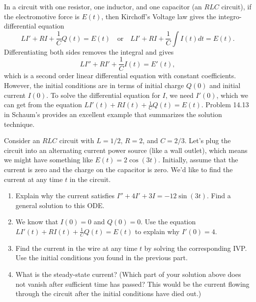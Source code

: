 In a circuit  with one resistor, one inductor, and one capacitor (an $RLC$ circuit), if the electromotive force is $E(t)$, then Kirchoff's Voltage law gives the integro-differential equation 
$$L I'+ RI+ \frac{1}{C}Q(t) =E(t) \quad \text{or}\quad L I'+ RI+ \frac{1}{C}\int I(t) dt = E(t).$$  
Differentiating both sides removes the integral and gives
$$L I''+ RI'+ \frac{1}{C}I(t) = E'(t),$$ which is a second order linear differential equation with constant coefficients. However, the initial conditions are in terms of initial charge $Q(0)$ and initial current $I(0)$. To solve the differential equation for $I$, we need $I'(0)$, which we can get from the equation $ L I'(t)+ RI(t)+ \frac{1}{C}Q(t) =E(t)$. Problem 14.13 in Schaum's provides an excellent example that summarizes the solution technique.
 
\begin{problem}
Consider an $RLC$ circuit with $L=1/2$, $R=2$, and $C=2/3$. Let's plug the circuit into an alternating current power source (like a wall outlet), which means we might have something like $E(t) = 2\cos(3t)$.  Initially, assume that the current is zero and the charge on the capacitor is zero. We'd like to find the current at any time $t$ in the circuit.
\begin{enumerate}
 \item Explain why the current satisfies $I''+4I'+3I=-12\sin(3t)$. Find a general solution to this ODE.
 \item We know that $I(0)=0$ and $Q(0)=0$.  Use the equation $L I'(t)+ RI(t)+ \frac{1}{C}Q(t) =E(t)$ to explain why $I'(0) = 4$. 
 \item Find the current in the wire at any time $t$ by solving the corresponding IVP. Use the initial conditions you found in the previous part.
 \item What is the steady-state current? (Which part of your solution above does not vanish after sufficient time has passed? This would be the current flowing through the circuit after the initial conditions have died out.)
\end{enumerate}
\end{problem}

